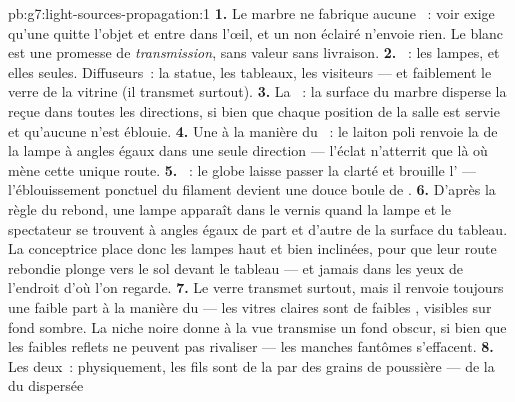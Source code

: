\begin{solution}{pb:g7:light-sources-propagation:1}
\textbf{1.} Le marbre ne fabrique aucune ~: voir exige qu'une
 quitte l'objet et entre dans l'œil, et un  non
éclairé n'envoie rien. Le blanc est une promesse de \emph{transmission},
sans valeur sans livraison.
\textbf{2.} ~: les lampes, et elles seules.
Diffuseurs~: la statue, les tableaux, les visiteurs --- et faiblement
le verre de la vitrine (il transmet surtout).
\textbf{3.} La ~: la surface du marbre disperse la 
reçue dans toutes les directions, si bien que chaque position de la
salle est servie et qu'aucune n'est éblouie.
\textbf{4.} Une  à la manière du ~: le laiton poli
renvoie la  de la lampe à angles égaux dans une seule
direction --- l'éclat n'atterrit que là où mène cette unique route.
\textbf{5.} ~: le globe laisse passer la clarté et
brouille l' --- l'éblouissement ponctuel du filament devient une
douce boule de .
\textbf{6.} D'après la règle du rebond, une lampe apparaît dans le
vernis quand la lampe et le spectateur se trouvent à angles égaux de
part et d'autre de la surface du tableau. La conceptrice place donc
les lampes haut et bien inclinées, pour que leur route rebondie
plonge vers le sol devant le tableau --- et jamais dans les yeux de
l'endroit d'où l'on regarde.
\textbf{7.} Le verre transmet surtout, mais il renvoie toujours une
faible part à la manière du  --- les vitres claires sont de
faibles , visibles sur fond sombre. La niche noire donne à la
vue transmise un fond obscur, si bien que les faibles reflets ne
peuvent pas rivaliser --- les manches fantômes s'effacent.
\textbf{8.} Les deux~: physiquement, les fils sont de la 
par des grains de poussière --- de la  du  dispersée

\end{solution}
